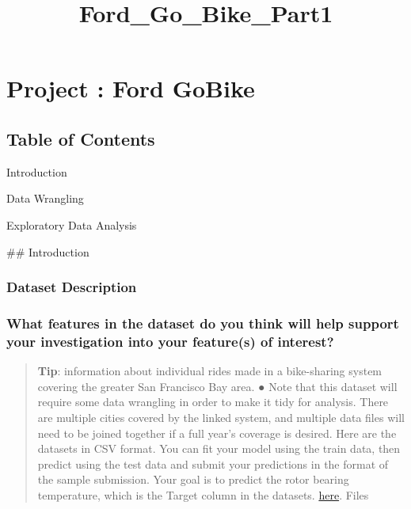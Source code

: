 \documentclass[11pt]{article}
\title{Ford\_Go\_Bike\_Part1}
\begin{document}
    
    \maketitle
    
    

    
    \hypertarget{project-ford-gobike}{%
\section{Project : Ford GoBike}\label{project-ford-gobike}}

\hypertarget{table-of-contents}{%
\subsection{Table of Contents}\label{table-of-contents}}

Introduction

Data Wrangling

Exploratory Data Analysis

    \#\# Introduction

\hypertarget{dataset-description}{%
\subsubsection{Dataset Description}\label{dataset-description}}

\hypertarget{what-features-in-the-dataset-do-you-think-will-help-support-your-investigation-into-your-features-of-interest}{%
\subsubsection{What features in the dataset do you think will help
support your investigation into your feature(s) of
interest?}\label{what-features-in-the-dataset-do-you-think-will-help-support-your-investigation-into-your-features-of-interest}}

\begin{quote}
\textbf{Tip}: information about individual rides made in a bike-sharing
system covering the greater San Francisco Bay area. ● Note that this
dataset will require some data wrangling in order to make it tidy for
analysis. There are multiple cities covered by the linked system, and
multiple data files will need to be joined together if a full year's
coverage is desired. Here are the datasets in CSV format. You can fit
your model using the train data, then predict using the test data and
submit your predictions in the format of the sample submission. Your
goal is to predict the rotor bearing temperature, which is the Target
column in the datasets.
\href{https://www.google.com/url?q=https://video.udacity-data.com/topher/2020/October/5f91cf38_201902-fordgobike-tripdata/201902-fordgobike-tripdata.csv\&sa=D\&source=editors\&ust=1669750197727856\&usg=AOvVaw0RJVqpWyfu7RoKaPH1gynL}{here}.
Files
\end{quote}
\end{document}
